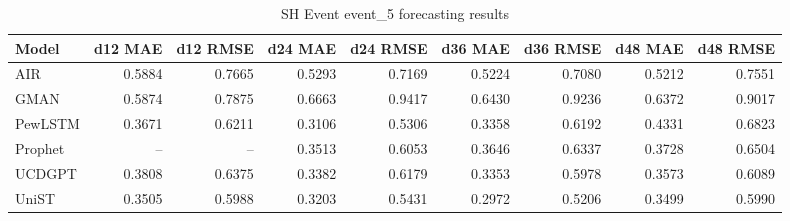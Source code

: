 \begin{table}[htbp]
\centering
\small
\caption{SH Event event\_5 forecasting results}
\label{tab:sh-event-event-5}
\begin{tabular}{lrrrrrrrr}
\toprule
Model & d12 MAE & d12 RMSE & d24 MAE & d24 RMSE & d36 MAE & d36 RMSE & d48 MAE & d48 RMSE \\
\midrule
AIR & 0.5884 & 0.7665 & 0.5293 & 0.7169 & 0.5224 & 0.7080 & 0.5212 & 0.7551 \\
GMAN & 0.5874 & 0.7875 & 0.6663 & 0.9417 & 0.6430 & 0.9236 & 0.6372 & 0.9017 \\
PewLSTM & 0.3671 & 0.6211 & 0.3106 & 0.5306 & 0.3358 & 0.6192 & 0.4331 & 0.6823 \\
Prophet & -- & -- & 0.3513 & 0.6053 & 0.3646 & 0.6337 & 0.3728 & 0.6504 \\
UCDGPT & 0.3808 & 0.6375 & 0.3382 & 0.6179 & 0.3353 & 0.5978 & 0.3573 & 0.6089 \\
UniST & 0.3505 & 0.5988 & 0.3203 & 0.5431 & 0.2972 & 0.5206 & 0.3499 & 0.5990 \\
\bottomrule
\end{tabular}
\end{table}
